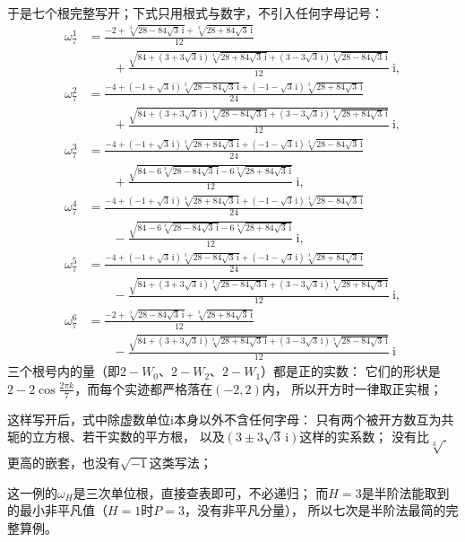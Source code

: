 \documentclass[UTF8,a4paper,11pt]{ctexart}
\newcommand{\ii}{\mathrm{i}}
\begin{document}
于是七个根完整写开；下式只用根式与数字，不引入任何字母记号：
{\small
\[
 \begin{aligned}
 \omega_7^{1}&=\frac{-2+\sqrt[3]{28-84\sqrt3\,\ii}+\sqrt[3]{28+84\sqrt3\,\ii}}{12}\\[2pt]
 &\qquad+\frac{\sqrt{84+(3+3\sqrt3\,\ii)\sqrt[3]{28+84\sqrt3\,\ii}
   +(3-3\sqrt3\,\ii)\sqrt[3]{28-84\sqrt3\,\ii}}}{12}\ \ii,\\[8pt]
 \omega_7^{2}&=\frac{-4+(-1+\sqrt3\,\ii)\sqrt[3]{28-84\sqrt3\,\ii}
   +(-1-\sqrt3\,\ii)\sqrt[3]{28+84\sqrt3\,\ii}}{24}\\[2pt]
 &\qquad+\frac{\sqrt{84+(3+3\sqrt3\,\ii)\sqrt[3]{28-84\sqrt3\,\ii}
   +(3-3\sqrt3\,\ii)\sqrt[3]{28+84\sqrt3\,\ii}}}{12}\ \ii,\\[8pt]
 \omega_7^{3}&=\frac{-4+(-1+\sqrt3\,\ii)\sqrt[3]{28+84\sqrt3\,\ii}
   +(-1-\sqrt3\,\ii)\sqrt[3]{28-84\sqrt3\,\ii}}{24}\\[2pt]
 &\qquad+\frac{\sqrt{84-6\sqrt[3]{28-84\sqrt3\,\ii}-6\sqrt[3]{28+84\sqrt3\,\ii}}}{12}\ \ii,\\[8pt]
 \omega_7^{4}&=\frac{-4+(-1+\sqrt3\,\ii)\sqrt[3]{28+84\sqrt3\,\ii}
   +(-1-\sqrt3\,\ii)\sqrt[3]{28-84\sqrt3\,\ii}}{24}\\[2pt]
 &\qquad-\frac{\sqrt{84-6\sqrt[3]{28-84\sqrt3\,\ii}-6\sqrt[3]{28+84\sqrt3\,\ii}}}{12}\ \ii,\\[8pt]
 \omega_7^{5}&=\frac{-4+(-1+\sqrt3\,\ii)\sqrt[3]{28-84\sqrt3\,\ii}
   +(-1-\sqrt3\,\ii)\sqrt[3]{28+84\sqrt3\,\ii}}{24}\\[2pt]
 &\qquad-\frac{\sqrt{84+(3+3\sqrt3\,\ii)\sqrt[3]{28-84\sqrt3\,\ii}
   +(3-3\sqrt3\,\ii)\sqrt[3]{28+84\sqrt3\,\ii}}}{12}\ \ii,\\[8pt]
 \omega_7^{6}&=\frac{-2+\sqrt[3]{28-84\sqrt3\,\ii}+\sqrt[3]{28+84\sqrt3\,\ii}}{12}\\[2pt]
 &\qquad-\frac{\sqrt{84+(3+3\sqrt3\,\ii)\sqrt[3]{28+84\sqrt3\,\ii}
   +(3-3\sqrt3\,\ii)\sqrt[3]{28-84\sqrt3\,\ii}}}{12}\ \ii
 \end{aligned}
\]
}
三个根号内的量（即$2-W_0$、$2-W_2$、$2-W_1$）都是正的实数：
它们的形状是$2-2\cos\frac{2\pi k}{7}$，而每个实迹都严格落在$(-2,2)$内，
所以开方时一律取正实根；\par

这样写开后，式中除虚数单位$\ii$本身以外不含任何字母：
只有两个被开方数互为共轭的立方根、若干实数的平方根，
以及$(3\pm3\sqrt3\,\ii)$这样的实系数；
没有比$\sqrt[3]{\ }$更高的嵌套，也没有$\sqrt{-1}$这类写法；\par

这一例的$\omega_H$是三次单位根，直接查表即可，不必递归；
而$H=3$是半阶法能取到的最小非平凡值（$H=1$时$P=3$，没有非平凡分量），
所以七次是半阶法最简的完整算例。\par
\end{document}
